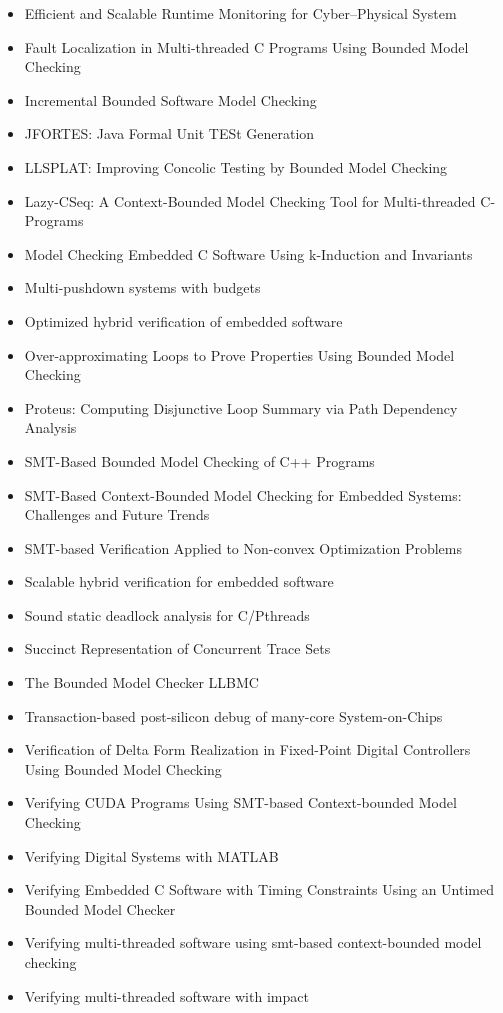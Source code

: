 \begin{itemize}
\item Efficient and Scalable Runtime Monitoring for Cyber--Physical System
\item Fault Localization in Multi-threaded C Programs Using Bounded Model Checking
\item Incremental Bounded Software Model Checking
\item JFORTES: Java Formal Unit TESt Generation
\item LLSPLAT: Improving Concolic Testing by Bounded Model Checking
\item Lazy-CSeq: A Context-Bounded Model Checking Tool for Multi-threaded C-Programs
\item Model Checking Embedded C Software Using k-Induction and Invariants
\item Multi-pushdown systems with budgets
\item Optimized hybrid verification of embedded software
\item Over-approximating Loops to Prove Properties Using Bounded Model Checking
\item Proteus: Computing Disjunctive Loop Summary via Path Dependency Analysis
\item SMT-Based Bounded Model Checking of C++ Programs
\item SMT-Based Context-Bounded Model Checking for Embedded Systems: Challenges and Future Trends
\item SMT-based Verification Applied to Non-convex Optimization Problems
\item Scalable hybrid verification for embedded software
\item Sound static deadlock analysis for C/Pthreads
\item Succinct Representation of Concurrent Trace Sets
\item The Bounded Model Checker LLBMC
\item Transaction-based post-silicon debug of many-core System-on-Chips
\item Verification of Delta Form Realization in Fixed-Point Digital Controllers Using Bounded Model Checking
\item Verifying CUDA Programs Using SMT-based Context-bounded Model Checking
\item Verifying Digital Systems with MATLAB
\item Verifying Embedded C Software with Timing Constraints Using an Untimed Bounded Model Checker
\item Verifying multi-threaded software using smt-based context-bounded model checking
\item Verifying multi-threaded software with impact
\end{itemize}



